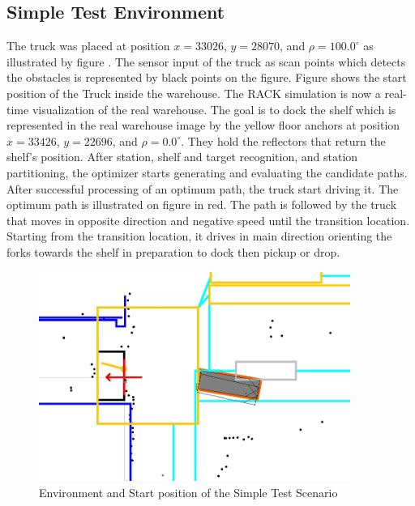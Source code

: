 \subsection{Simple Test Environment}
The truck was placed at position \(x = 33026\), \(y = 28070\), and \(\rho = 100.0^\circ\) 
as illustrated by 
figure .
The sensor input of the truck as scan points which detects the obstacles is represented by black points
on the figure. Figure  shows the start position of the Truck inside the warehouse.
The RACK simulation is now a real-time visualization of the real warehouse.
The goal is to dock the shelf which is represented in the real warehouse image 
by the yellow floor anchors at position \(x = 33426\), \(y = 22696\), and \(\rho = 0.0^\circ\). 
They hold the reflectors that return the shelf's position.
After station, shelf and target recognition, and station partitioning,
the optimizer starts generating and evaluating the candidate paths.
After successful processing of an optimum path, the truck start driving it.
The optimum path is illustrated on figure  in red. The path is followed by the truck 
that moves in opposite direction and negative speed until the transition location.
Starting from the transition location, it drives in main direction orienting the forks 
towards the shelf in preparation to dock then pickup or drop. 


\begin{figure}[H]
    \begin{center}
        \includegraphics[width=4in]{images/Chap3/StartSimpleEnv.png} %
        \caption{Environment and Start position of the Simple Test Scenario}
        \label{OptResult10}
        \end{center}    
\end{figure}


